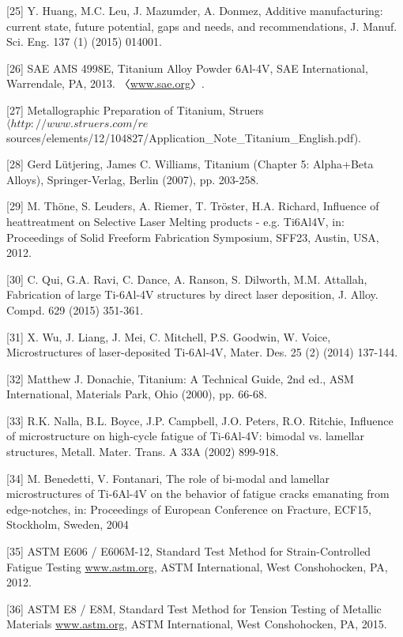 \documentclass[10pt]{article}
\begin{document}
[25] Y. Huang, M.C. Leu, J. Mazumder, A. Donmez, Additive manufacturing: current state, future potential, gaps and needs, and recommendations, J. Manuf. Sci. Eng. 137 (1) (2015) 014001.

[26] SAE AMS 4998E, Titanium Alloy Powder 6Al-4V, SAE International, Warrendale, PA, 2013. 〈\href{http://www.sae.org}{www.sae.org}〉.

[27] Metallographic Preparation of Titanium, Struers $\langle h t t p: / / w w w . s t r u e r s . c o m / r e$ sources/elements/12/104827/Application\_Note\_Titanium\_English.pdf).

[28] Gerd Lütjering, James C. Williams, Titanium (Chapter 5: Alpha+Beta Alloys), Springer-Verlag, Berlin (2007), pp. 203-258.

[29] M. Thöne, S. Leuders, A. Riemer, T. Tröster, H.A. Richard, Influence of heattreatment on Selective Laser Melting products - e.g. Ti6Al4V, in: Proceedings of Solid Freeform Fabrication Symposium, SFF23, Austin, USA, 2012.

[30] C. Qui, G.A. Ravi, C. Dance, A. Ranson, S. Dilworth, M.M. Attallah, Fabrication of large Ti-6Al-4V structures by direct laser deposition, J. Alloy. Compd. 629 (2015) 351-361.

[31] X. Wu, J. Liang, J. Mei, C. Mitchell, P.S. Goodwin, W. Voice, Microstructures of laser-deposited Ti-6Al-4V, Mater. Des. 25 (2) (2014) 137-144.

[32] Matthew J. Donachie, Titanium: A Technical Guide, 2nd ed., ASM International, Materials Park, Ohio (2000), pp. 66-68.

[33] R.K. Nalla, B.L. Boyce, J.P. Campbell, J.O. Peters, R.O. Ritchie, Influence of microstructure on high-cycle fatigue of Ti-6Al-4V: bimodal vs. lamellar structures, Metall. Mater. Trans. A 33A (2002) 899-918.

[34] M. Benedetti, V. Fontanari, The role of bi-modal and lamellar microstructures of Ti-6Al-4V on the behavior of fatigue cracks emanating from edge-notches, in: Proceedings of European Conference on Fracture, ECF15, Stockholm, Sweden, 2004

[35] ASTM E606 / E606M-12, Standard Test Method for Strain-Controlled Fatigue Testing \href{http://www.astm.org}{www.astm.org}, ASTM International, West Conshohocken, PA, 2012.

[36] ASTM E8 / E8M, Standard Test Method for Tension Testing of Metallic\\
Materials \href{http://www.astm.org}{www.astm.org}, ASTM International, West Conshohocken, PA, 2015.
\end{document}
